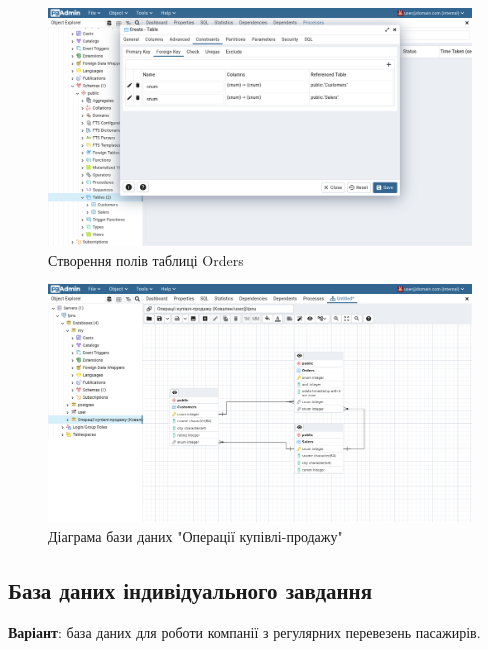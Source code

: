 \documentclass[14pt]{extreport}
\begin{document}
\begin{normalsize}
	\begin{figure}[H]
		\centering
		\includegraphics[scale=0.35]{15}
		\caption{Створення полів таблиці Orders}
	\end{figure}
	\fi
	\begin{figure}[H]
		\centering
		\includegraphics[scale=0.35]{16}
		\caption{Діаграма бази даних "Операції купівлі-продажу"}
	\end{figure}

	\subsection*{База даних індивідуального завдання}
	\textbf{Варіант}: база даних для роботи компанії з регулярних перевезень пасажирів.


\end{normalsize}
\end{document}
